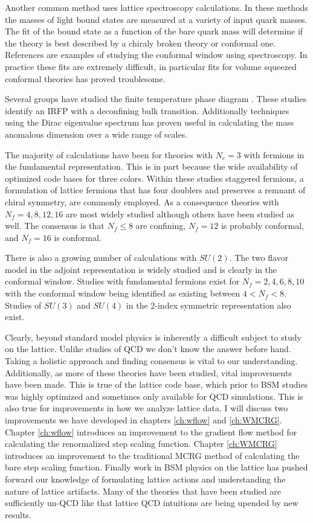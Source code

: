 Another common method uses lattice spectroscopy calculations.
In these methods the masses of light bound states are measured at a variety of input quark masses.
The fit of the bound state as a function of the bare quark mass will determine if the theory is best described by a chiraly broken theory or conformal one.
References \cite{Jin:2008rc,Jin:2009mc,Fodor:2010zzb} are examples of studying the conformal window using spectroscopy.
In practice these fits are extremely difficult, in particular fits for volume squeezed conformal theories has proved troublesome.

Several groups have studied the finite temperature phase diagram \cite{Iwasaki:2003de,Schaich:2012fr}.
These studies identify an IRFP with a deconfining bulk transition.
Additionally techniques using the Dirac eigenvalue spectrum \cite{Cheng:2013eu} has proven useful in calculating the mass anomalous dimension over a wide range of scales.

The majority of calculations have been for theories with $N_c=3$ with fermions in the fundamental representation.
This is in part because the wide availability of optimized code bases for three colors.
Within these studies staggered fermions, a formulation of lattice fermions that has four doublers and preserves a remnant of chiral symmetry, are commonly employed.
As a consequence theories with $N_f=4,8,12,16$ are most widely studied although others have been studied as well.
The consensus is that $N_f\le8$ are confining, $N_f=12$ is probably conformal, and $N_f=16$ is conformal.

There is also a growing number of calculations with $SU(2)$.
The two flavor model in the adjoint representation is widely studied and is clearly in the conformal window\cite{Catterall:2007yx,DelDebbio:2010hu,DeGrand:2011qd,DeGrand:2011vp}.
Studies with fundamental fermions exist for $N_f=2,4,6,8,10$ with the conformal window being identified as existing between $4<N_f<8$.
Studies of $SU(3)$ and $SU(4)$ in the 2-index symmetric representation also exist.

Clearly, beyond standard model physics is inherently a difficult subject to study on the lattice.
Unlike studies of QCD we don't know the answer before hand.
Taking a holistic approach and finding consensus is vital to our understanding.
Additionally, as more of these theories have been studied, vital improvements have been made.
This is true of the lattice code base, which prior to BSM studies was highly optimized and sometimes only available for QCD simulations.
This is also true for improvements in how we analyze lattice data.
I will discuss two improvements we have developed in chapters \ref{ch:wflow} and \ref{ch:WMCRG}.
Chapter \ref{ch:wflow} introduces an improvement to the gradient flow method for calculating the renormalized step scaling function.
Chapter \ref{ch:WMCRG} introduces an improvement to the traditional MCRG method of calculating the bare step scaling function.
Finally work in BSM physics on the lattice has pushed forward our knowledge of formulating lattice actions and understanding the nature of lattice artifacts.
Many of the theories that have been studied are sufficiently un-QCD like that lattice QCD intuitions are being upended by new results.
